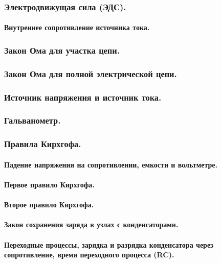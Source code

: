 \documentclass{article}
\begin{document}
        \subsubsection{Электродвижущая сила (ЭДС).}
            \paragraph{Внутреннее сопротивление источника тока.}
        \subsubsection{Закон Ома для участка цепи.}
        \subsubsection{Закон Ома для полной электрической цепи.}
        \subsubsection{Источник напряжения и источник тока.}
        \subsubsection{Гальванометр.}
        \subsubsection{Правила Кирхгофа.}
            \paragraph{Падение напряжения на сопротивлении, емкости и вольтметре.}
            \paragraph{Первое правило Кирхгофа.}
            \paragraph{Второе правило Кирхгофа.}
            \paragraph{Закон сохранения заряда в узлах с конденсаторами.}
            \paragraph{Переходные процессы, зарядка и разрядка конденсатора через сопротивление, время переходного процесса (RC).}
\end{document}
